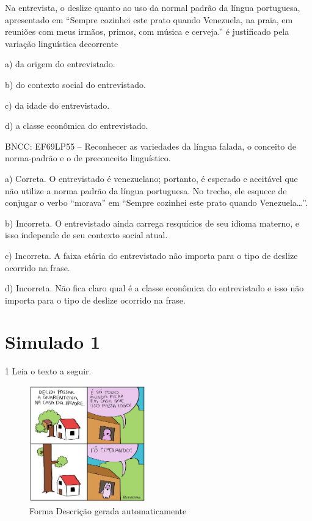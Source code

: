 Na entrevista, o deslize quanto ao uso da normal padrão da língua
portuguesa, apresentado em ``Sempre cozinhei este prato quando
Venezuela, na praia, em reuniões com meus irmãos, primos, com música e
cerveja.'' é justificado pela variação linguística decorrente

a) da origem do entrevistado.

b) do contexto social do entrevistado.

c) da idade do entrevistado.

d) a classe econômica do entrevistado.

BNCC: EF69LP55 -- Reconhecer as variedades da língua falada, o conceito
de norma-padrão e o de preconceito linguístico.

a) Correta. O entrevistado é venezuelano; portanto, é esperado e
aceitável que não utilize a norma padrão da língua portuguesa. No
trecho, ele esquece de conjugar o verbo ``morava'' em ``Sempre cozinhei
este prato quando Venezuela\ldots{}''.

b) Incorreta. O entrevistado ainda carrega resquícios de seu idioma
materno, e isso independe de seu contexto social atual.

c) Incorreta. A faixa etária do entrevistado não importa para o tipo de
deslize ocorrido na frase.

d) Incorreta. Não fica claro qual é a classe econômica do entrevistado e
isso não importa para o tipo de deslize ocorrido na frase.


\section{Simulado 1}

\num{1} Leia o texto a seguir.

\begin{figure}
\centering
\includegraphics[width=1.98077in,height=1.98077in]{./imgSAEB_6_POR/media/image34.jpeg}
\caption{Forma Descrição gerada automaticamente}
\end{figure}

